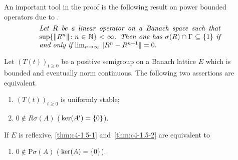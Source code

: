 An important tool in the proof is the following result on power bounded operators due to \textcite{katznelsontzafriri:1984}.
\begin{equation}\label{eq:c4-1.4}
\begin{minipage}{.75\linewidth}
\textit{Let $R$ be a linear operator on a Banach space such that $\sup\{ \|R^{n}\| \colon n \in \N \} < \infty$. 
Then one has $\sigma(R) \cap \Gamma \subseteq \{1\}$ if and only if 
$ \lim_{n \to \infty} \|R^{n} - R^{n+1}\| = 0$.}
\end{minipage}
\end{equation}
\begin{theorem}\label{thm:c4-1.5}%
Let $(T(t))_{t\geq 0}$ be a positive semigroup on a Banach lattice $E$ which is bounded and eventually norm continuous.
The following two assertions are equivalent.
\begin{enumerate}[\upshape (a)]
    \item \label{thm:c4-1.5-1}
    $(T(t))_{t\geq 0}$ is uniformly stable;
    
    \item \label{thm:c4-1.5-2}
    $0 \notin R\sigma(A)$ (\ie  $\mathop{}\mathrm{ker}(A') 
    = \{0\}$).
\end{enumerate}
If $E$ is reflexive, \ref{thm:c4-1.5-1} and~\ref{thm:c4-1.5-2} are equivalent to
\begin{enumerate}

\item  \label{thm:c4-1.5-3}
$0 \notin \text{P}\sigma(A)$ (\ie  $\mathop{}\mathrm{ker}(A) = \{0\}$).
\end{enumerate}
\end{theorem}
